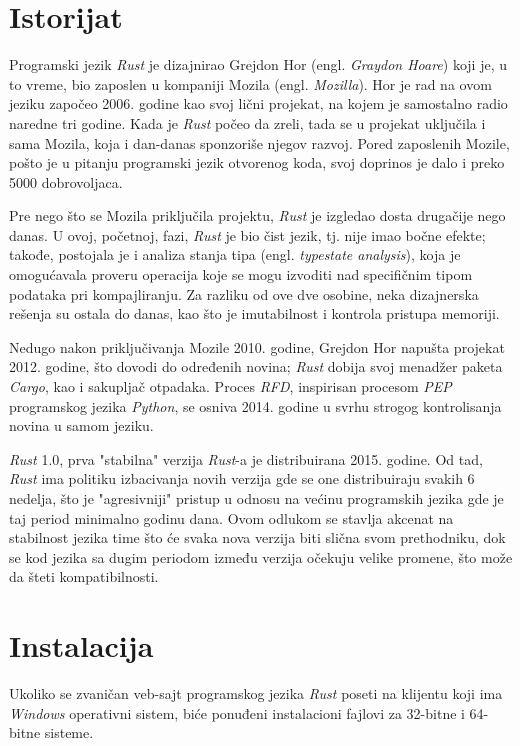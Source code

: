 \documentclass[12pt,oneside]{memoir}
\begin{document}
\section{Istorijat}
Programski jezik \emph{Rust} je dizajnirao Grejdon Hor 
(engl. \emph{Graydon Hoare}) koji je, u to vreme, bio zaposlen u kompaniji 
Mozila (engl. \emph{Mozilla}).
Hor je rad na ovom jeziku započeo 2006. godine kao svoj lični projekat, 
na kojem je samostalno radio naredne tri godine.
Kada je \emph{Rust} počeo da zreli, tada se u projekat 
uključila i sama Mozila, koja i dan-danas sponzoriše njegov razvoj.
Pored zaposlenih Mozile, pošto je u pitanju programski jezik otvorenog koda,
svoj doprinos je dalo i preko 5000 dobrovoljaca.

Pre nego što se Mozila priključila projektu, \emph{Rust} je izgledao dosta 
drugačije nego danas. U ovoj, početnoj, fazi, \emph{Rust} je bio čist jezik, 
tj. nije imao bočne efekte; takođe, postojala je i analiza stanja tipa 
(engl. \emph{typestate analysis}), koja je omogućavala proveru operacija 
koje se mogu izvoditi nad specifičnim tipom podataka pri kompajliranju. Za 
razliku od ove dve osobine, neka dizajnerska rešenja su ostala do danas, kao 
što je imutabilnost i kontrola pristupa memoriji.

Nedugo nakon priključivanja Mozile 2010. godine, Grejdon Hor napušta projekat 
2012. godine, što dovodi do određenih novina; \emph{Rust} dobija svoj menadžer 
paketa \emph{Cargo}, kao i sakupljač otpadaka. Proces \emph{RFD}, inspirisan 
procesom \emph{PEP} programskog jezika \emph{Python}, se osniva 2014. 
godine u svrhu strogog kontrolisanja novina u samom jeziku.

\emph{Rust} 1.0, prva "stabilna" verzija \emph{Rust}-a je distribuirana 2015. 
godine. Od tad, \emph{Rust} ima politiku izbacivanja novih 
verzija gde se one distribuiraju svakih 6 nedelja, što je "agresivniji" pristup 
u odnosu na većinu programskih jezika gde je taj period minimalno godinu dana. 
Ovom odlukom se stavlja akcenat na stabilnost jezika time što će svaka nova 
verzija biti slična svom prethodniku, dok se kod jezika sa dugim periodom 
između verzija očekuju velike promene, što može da šteti kompatibilnosti. 

\section{Instalacija}
Ukoliko se zvaničan veb-sajt programskog jezika \emph{Rust} poseti na 
klijentu koji ima \emph{Windows} operativni sistem, biće ponuđeni 
instalacioni fajlovi za 32-bitne i 64-bitne sisteme.
\end{document}
